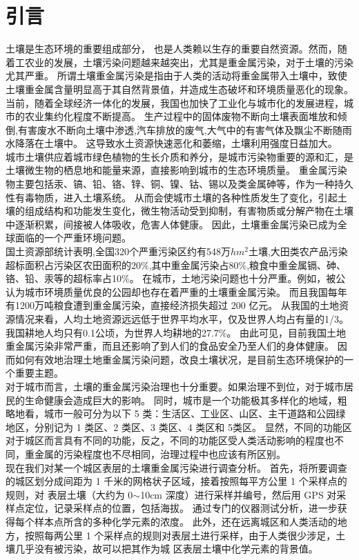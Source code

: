 \documentclass[a4paper]{article}
\begin{document}
\newpage

\tableofcontents

\newpage

\part{引言}
土壤是生态环境的重要组成部分， 也是人类赖以生存的重要自然资源。然而，随着工农业的发展，土壤污染问题越来越突出，尤其是重金属污染，对于土壤的污染尤其严重。
所谓土壤重金属污染是指由于人类的活动将重金属带入土壤中，致使土壤重金属含量明显高于其自然背景值，并造成生态破坏和环境质量恶化的现象。
当前，随着全球经济一体化的发展，我国也加快了工业化与城市化的发展进程，城市的农业集约化程度不断提高。
生产过程中的固体废物不断向土壤表面堆放和倾倒,有害废水不断向土壤中渗透,汽车排放的废气,大气中的有害气体及飘尘不断随雨水降落在土壤中。
这导致水土资源快速恶化和萎缩，土壤利用强度日益加大。   \\
\indent 城市土壤供应着城市绿色植物的生长介质和养分，是城市污染物重要的源和汇，是土壤微生物的栖息地和能量来源，直接影响到城市的生态环境质量。
重金属污染物主要包括汞、镐、铅、铬、锌、铜、镍、钴、锡以及类金属砷等，作为一种持久性有毒物质，进入土壤系统。
从而会使城市土壤的各种性质发生了变化，引起土壤的组成结构和功能发生变化，微生物活动受到抑制，有害物质或分解产物在土壤中逐渐积累，间接被人体吸收，危害人体健康。
因此，土壤重金属污染已成为全球面临的一个严重环境问题。   \\
\indent 国土资源部统计表明,全国320个严重污染区约有548万$hm^2$土壤,大田类农产品污染超标面积占污染区农田面积的20\%,其中重金属污染占80\%,粮食中重金属镉、砷、铬、铅、汞等的超标率占10\%。
在城市，土地污染问题也十分严重。例如，被公认为城市环境质量优良的公园却也存在着严重的土壤重金属污染。
而且我国每年有1200万吨粮食遭到重金属污染，直接经济损失超过 200 亿元。
从我国的土地资源情况来看，人均土地资源远远低于世界平均水平，仅及世界人均占有量的1/3。我国耕地人均只有0.1公顷，为世界人均耕地的27.7\%。
由此可见，目前我国土地重金属污染非常严重，而且还影响了到人们的食品安全乃至人们的身体健康。
因而如何有效地治理土地重金属污染问题，改良土壤状况，是目前生态环境保护的一个重要主题。    \\
\indent 对于城市而言，土壤的重金属污染治理也十分重要。如果治理不到位，对于城市居民的生命健康会造成巨大的影响。
同时，城市是一个功能极其多样化的地域，粗略地看，城市一般可分为以下 5 类：生活区、工业区、山区、主干道路和公园绿地区，分别记为 1 类区、2 类区、3 类区、4 类区和 5类区。
显然，不同的功能区对于城区而言具有不同的功能，反之，不同的功能区受人类活动影响的程度也不同，重金属的污染程度也不尽相同，治理过程中也应该有所区别。 \\
\indent 现在我们对某一个城区表层的土壤重金属污染进行调查分析。
首先，将所要调查的城区划分成间距为 1 千米的网格状子区域，接着按照每平方公里 1 个采样点的规则，对
表层土壤（大约为 0$\sim$10cm 深度）进行采样并编号，然后用 GPS 对采样点定位，记录采样点的位置，包括海拔。
通过专门的仪器测试分析，进一步获得每个样本点所含的多种化学元素的浓度。
此外，还在远离城区和人类活动的地方，按照每两公里 1 个采样点的规则对表层土进行采样，由于人类很少涉足，土壤几乎没有被污染，故可以把其作为城
区表层土壤中化学元素的背景值。\\
\end{document}

